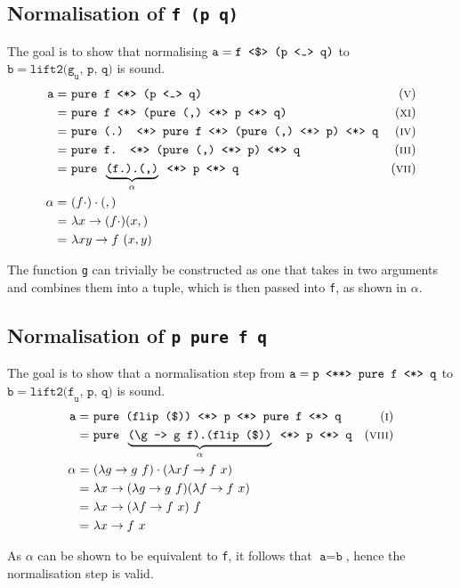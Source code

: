 \subsection{Normalisation of \texorpdfstring{\texttt{f \fmap (p \mult q)}}{F<fmap>(P<mult>Q)}}
The goal is to show that normalising $\texttt{a} = \texttt{f \fmap (p \mult q)}$ to $\texttt{b} = \texttt{lift2(g}_\texttt{u}\texttt{, p, q)}$ is sound.
\begin{align*}
    \texttt{a} =\ & \texttt{pure f \ap (p \mult q)} & \equi[5] \\
    =\ & \texttt{pure f \ap (pure (,) \ap p \ap q)} & \equi[11] \\
    =\ & \texttt{pure (.) \ap pure f \ap (pure (,) \ap p) \ap q} & \equi[4] \\
    =\ & \texttt{pure f. \ap (pure (,) \ap p) \ap q} & \equi[3] \\
    =\ & \texttt{pure }\underbrace{\texttt{(f.).(,)}}_{\alpha}\texttt{ \ap p \ap q} & \equi[7] \\
    \alpha =\ & (f \cdot) \cdot (,) \\
    =\ & \lambda x \to (f \cdot) (x,) \\
    =\ & \lambda xy \to f\ (x, y)
\end{align*}

The function \texttt{g} can trivially be constructed as one that takes in two arguments and combines them into a tuple, which is then passed into \texttt{f}, as shown in $\alpha$.

\subsection{Normalisation of \texttt{p \pa pure f \ap q}}
The goal is to show that a normalisation step from $\texttt{a} = \texttt{p \pa pure f \ap q}$ to $\texttt{b} = \texttt{lift2(f}_\texttt{u}\texttt{, p, q)}$ is sound.
\begin{align*}
    \texttt{a} =\ & \texttt{pure (flip (\$)) \ap p \ap pure f \ap q} & \equi[1] \\
    =\ & \texttt{pure }\underbrace{\texttt{(\textbackslash g -> g f).(flip (\$))}}_{\alpha}\texttt{ \ap p \ap q} & \equi[8] \\
    \alpha =\ & (\lambda g \to g\ f) \cdot (\lambda xf \to f\ x) \\
    =\ & \lambda x \to (\lambda g \to g\ f)(\lambda f \to f\ x) \\
    =\ & \lambda x \to (\lambda f \to f\ x)\ f \\
    =\ & \lambda x \to f\ x
\end{align*}

As $\alpha$ can be shown to be equivalent to \texttt{f}, it follows that $\texttt{a} = \texttt{b}$, hence the normalisation step is valid.
